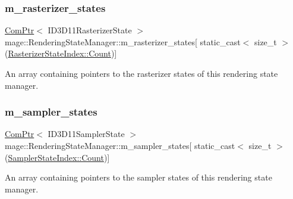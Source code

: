 \subsubsection{\texorpdfstring{m\+\_\+rasterizer\+\_\+states}{m\_rasterizer\_states}}
{\footnotesize\ttfamily \hyperlink{namespacemage_ae74f374780900893caa5555d1031fd79}{Com\+Ptr}$<$ I\+D3\+D11\+Rasterizer\+State $>$ mage\+::\+Rendering\+State\+Manager\+::m\+\_\+rasterizer\+\_\+states\mbox{[} static\+\_\+cast$<$ size\+\_\+t $>$(\hyperlink{classmage_1_1_rendering_state_manager_aa8eee3b02b7d4ba0a046870fae43640aae93f994f01c537c4e2f7d8528c3eb5e9}{Rasterizer\+State\+Index\+::\+Count})\mbox{]}\hspace{0.3cm}{\ttfamily [private]}}

An array containing pointers to the rasterizer states of this rendering state manager. \hypertarget{classmage_1_1_rendering_state_manager_ae486a0cc711b5b02af4364a3f7184ccd}{}\label{classmage_1_1_rendering_state_manager_ae486a0cc711b5b02af4364a3f7184ccd} 
\subsubsection{\texorpdfstring{m\+\_\+sampler\+\_\+states}{m\_sampler\_states}}
{\footnotesize\ttfamily \hyperlink{namespacemage_ae74f374780900893caa5555d1031fd79}{Com\+Ptr}$<$ I\+D3\+D11\+Sampler\+State $>$ mage\+::\+Rendering\+State\+Manager\+::m\+\_\+sampler\+\_\+states\mbox{[} static\+\_\+cast$<$ size\+\_\+t $>$(\hyperlink{classmage_1_1_rendering_state_manager_a17ea0fda0247ee5d379b62a882db95a3ae93f994f01c537c4e2f7d8528c3eb5e9}{Sampler\+State\+Index\+::\+Count})\mbox{]}\hspace{0.3cm}{\ttfamily [private]}}

An array containing pointers to the sampler states of this rendering state manager. 